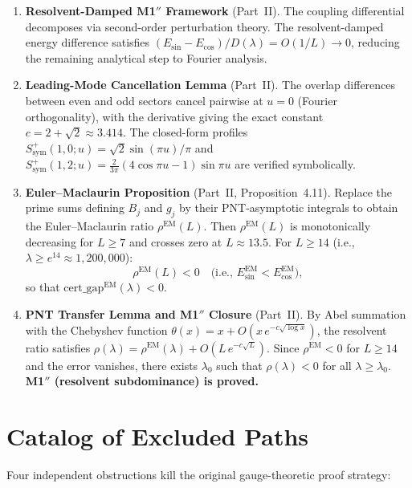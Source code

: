 \documentclass[12pt,a4paper]{article}
\theoremstyle{definition}
\theoremstyle{remark}
\begin{document}
\begin{enumerate}[label=\textbf{N\arabic*},leftmargin=3em]
  \item \textbf{Resolvent-Damped M1$''$ Framework} (Part~II). The coupling differential decomposes via second-order perturbation theory. The resolvent-damped energy difference satisfies $(E_{\sin} - E_{\cos})/D(\lambda) = O(1/L) \to 0$, reducing the remaining analytical step to Fourier analysis.

  \item \textbf{Leading-Mode Cancellation Lemma} (Part~II). The overlap differences between even and odd sectors cancel pairwise at $u = 0$ (Fourier orthogonality), with the derivative giving the exact constant $c = 2 + \sqrt{2} \approx 3.414$. The closed-form profiles $S^+_{\mathrm{sym}}(1,0;u) = \sqrt{2}\sin(\pi u)/\pi$ and $S^+_{\mathrm{sym}}(1,2;u) = \tfrac{2}{3\pi}(4\cos\pi u - 1)\sin\pi u$ are verified symbolically.

  \item \textbf{Euler--Maclaurin Proposition} (Part~II, Proposition~4.11). Replace the prime sums defining $B_j$ and $g_j$ by their PNT-asymptotic integrals to obtain the Euler--Maclaurin ratio $\rho^{\mathrm{EM}}(L)$. Then $\rho^{\mathrm{EM}}(L)$ is monotonically decreasing for $L \geq 7$ and crosses zero at $L \approx 13.5$. For $L \geq 14$ (i.e., $\lambda \geq e^{14} \approx 1{,}200{,}000$):
  \[
    \rho^{\mathrm{EM}}(L) < 0 \quad\text{(i.e., } E_{\sin}^{\mathrm{EM}} < E_{\cos}^{\mathrm{EM}}\text{)},
  \]
  so that $\mathrm{cert\_gap}^{\mathrm{EM}}(\lambda) < 0$.

  \item \textbf{PNT Transfer Lemma and M1$''$ Closure} (Part~II). By Abel summation with the Chebyshev function $\theta(x) = x + O(x\,e^{-c\sqrt{\log x}})$, the resolvent ratio satisfies $\rho(\lambda) = \rho^{\mathrm{EM}}(\lambda) + O(L\,e^{-c\sqrt{L}})$. Since $\rho^{\mathrm{EM}} < 0$ for $L \geq 14$ and the error vanishes, there exists $\lambda_0$ such that $\rho(\lambda) < 0$ for all $\lambda \geq \lambda_0$. \textbf{M1$''$ (resolvent subdominance) is proved.}
\end{enumerate}


\section{Catalog of Excluded Paths}
\label{sec:excluded}

Four independent obstructions kill the original gauge-theoretic proof strategy:
\end{document}
